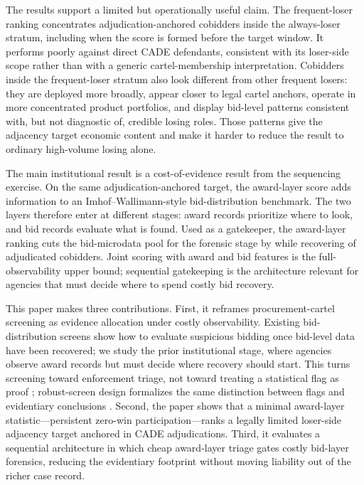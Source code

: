 The results support a limited but operationally useful claim.
The frequent-loser ranking concentrates adjudication-anchored
cobidders inside the always-loser stratum, including when the
score is formed before the target window. It performs poorly
against direct CADE defendants, consistent with its loser-side
scope rather than with a generic cartel-membership
interpretation. Cobidders inside the frequent-loser stratum also
look different from other frequent losers: they are deployed more
broadly, appear closer to legal cartel anchors, operate in more
concentrated product portfolios, and display bid-level patterns
consistent with, but not diagnostic of, credible losing roles.
Those patterns give the adjacency target economic content and
make it harder to reduce the result to ordinary high-volume
losing alone.

The main institutional result is a cost-of-evidence result from
the sequencing exercise. On the same adjudication-anchored
target, the award-layer score adds information to an
Imhof--Wallimann-style bid-distribution benchmark. The two
layers therefore enter at different stages: award records
prioritize where to look, and bid records evaluate what is
found. Used as a gatekeeper, the award-layer ranking cuts the
bid-microdata pool for the forensic stage by \valGateFootprintPct{} while
recovering \valGateSeqKTwoKOneTPIn{} of \valCobidders{} adjudicated cobidders. Joint scoring with
award and bid features is the full-observability upper bound;
sequential gatekeeping is the architecture relevant for agencies
that must decide where to spend costly bid recovery.

This paper makes three contributions. First, it reframes
procurement-cartel screening as evidence allocation under costly
observability. Existing bid-distribution screens show how to
evaluate suspicious bidding once bid-level data have been
recovered; we study the prior institutional stage, where
agencies observe award records but must decide where recovery
should start. This turns screening toward enforcement triage,
not toward treating a statistical flag as proof
\citep{harrington2008detecting,sanchezgraells2019screening};
robust-screen design formalizes the same distinction between
flags and evidentiary conclusions \citep{chassang2022robust}.
Second, the paper shows that a minimal award-layer
statistic---persistent zero-win participation---ranks a legally
limited loser-side adjacency target anchored in CADE
adjudications. Third, it evaluates a sequential architecture in
which cheap award-layer triage gates costly bid-layer forensics,
reducing the evidentiary footprint without moving liability out
of the richer case record.

